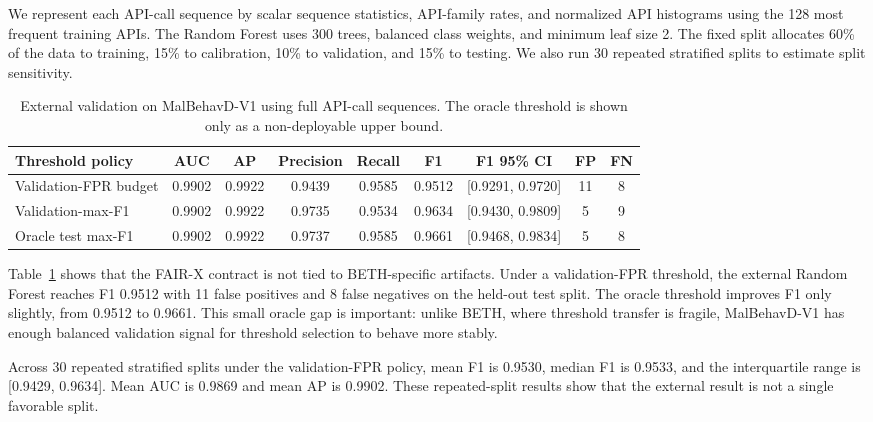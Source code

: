 \documentclass[10pt,journal,compsoc]{IEEEtran}
\begin{document}
We represent each API-call sequence by scalar sequence statistics, API-family rates, and normalized API histograms using the 128 most frequent training APIs. The Random Forest uses 300 trees, balanced class weights, and minimum leaf size 2. The fixed split allocates 60\% of the data to training, 15\% to calibration, 10\% to validation, and 15\% to testing. We also run 30 repeated stratified splits to estimate split sensitivity.

\begin{table}[t]
\centering
\caption{External validation on MalBehavD-V1 using full API-call sequences. The oracle threshold is shown only as a non-deployable upper bound.}
\label{tab:malbehavd_external}
\begin{tabular}{lcccccccc}
\toprule
\textbf{Threshold policy} & \textbf{AUC} & \textbf{AP} & \textbf{Precision} & \textbf{Recall} & \textbf{F1} & \textbf{F1 95\% CI} & \textbf{FP} & \textbf{FN} \\
\midrule
Validation-FPR budget & 0.9902 & 0.9922 & 0.9439 & 0.9585 & 0.9512 & [0.9291, 0.9720] & 11 & 8 \\
Validation-max-F1 & 0.9902 & 0.9922 & 0.9735 & 0.9534 & 0.9634 & [0.9430, 0.9809] & 5 & 9 \\
Oracle test max-F1 & 0.9902 & 0.9922 & 0.9737 & 0.9585 & 0.9661 & [0.9468, 0.9834] & 5 & 8 \\
\bottomrule
\end{tabular}
\end{table}

Table~\ref{tab:malbehavd_external} shows that the FAIR-X contract is not tied to BETH-specific artifacts. Under a validation-FPR threshold, the external Random Forest reaches F1 0.9512 with 11 false positives and 8 false negatives on the held-out test split. The oracle threshold improves F1 only slightly, from 0.9512 to 0.9661. This small oracle gap is important: unlike BETH, where threshold transfer is fragile, MalBehavD-V1 has enough balanced validation signal for threshold selection to behave more stably.

Across 30 repeated stratified splits under the validation-FPR policy, mean F1 is 0.9530, median F1 is 0.9533, and the interquartile range is [0.9429, 0.9634]. Mean AUC is 0.9869 and mean AP is 0.9902. These repeated-split results show that the external result is not a single favorable split.
\end{document}

